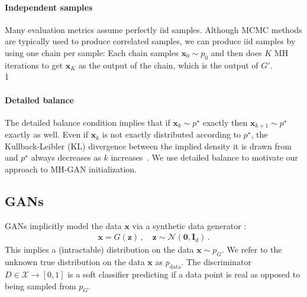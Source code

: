 \documentclass{article}
\renewcommand{\vec}[1]{{\boldsymbol{\mathbf{#1}}}} %
\newcommand{\R}{\mathbb{R}}
\newcommand{\set}[1]{\mathcal{#1}}
\newcommand{\sample}{\sim}
\newcommand{\norm}{\mathcal{N}}
\newcommand{\target}{{p^\star}}
\newcommand{\pinit}{{p_0}}
\newcommand{\PG}{{p_G}}
\newcommand{\PR}{{p_{\textrm{data}}}}
\newcommand{\setx}{\set{X}}
\begin{document}
\paragraph{Independent samples}
Many evaluation metrics assume perfectly iid samples.
Although MCMC methods are typically used to produce correlated samples, we can produce iid samples by using one chain per sample:
Each chain samples $\vec x_0 \sample \pinit$ and then does $K$ MH iterations to get $\vec x_K$ as the output of the chain, which is the output of $G'$.\\
1  %

\paragraph{Detailed balance}
The detailed balance condition implies that if $\vec x_k \sample \target$ exactly then $\vec x_{k+1} \sample \target$ exactly as well.
Even if $\vec x_k$ is not exactly distributed according to $\target$, the Kullback-Leibler (KL) divergence between the implied density it is drawn from and $\target$ always decreases as $k$ increases~\citep{Murray2008}.
We use detailed balance to motivate our approach to MH-GAN initialization.


\subsection{GANs}
\label{sec:GANs}

GANs implicitly model the data $\vec x$ via a synthetic data generator \smash{$G \in \R^{d} \rightarrow \setx$}:
\begin{align}
  \vec x = G(\vec z)\,, \quad \vec z \sample \norm(\vec 0, \vec I_{d})\,.
\end{align}
This implies a (intractable) distribution on the data $\vec x \sample \PG$.
We refer to the unknown true distribution on the data $\vec x$ as $\PR$.
The discriminator $D \in \setx \rightarrow [0,1]$ is a soft classifier predicting if a data point is real as opposed to being sampled from $\PG$\@.
\end{document}

